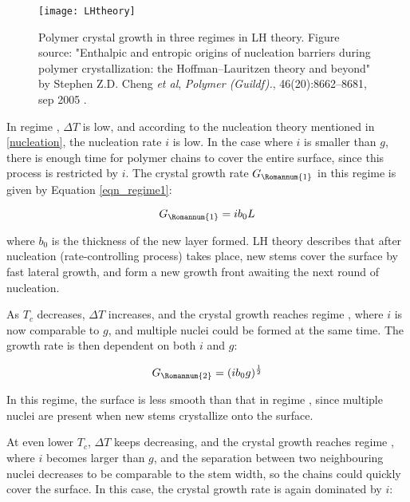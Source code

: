 \begin{figure}[H]
\center
\texttt{[image: LHtheory]}
\caption[Polymer crystal growth in three regimes in LH theory.]{Polymer crystal growth in three regimes in LH theory. Figure source: "Enthalpic and entropic origins of nucleation barriers during polymer crystallization: the Hoffman–Lauritzen theory and beyond" by Stephen Z.D. Cheng \textit{et al}, \textit{Polymer (Guildf).}, 46(20):8662–8681, sep 2005  \cite{Cheng2005}.}
\label{fig:LH theory}
\end{figure}

In regime , $\Delta T$ is low, and according to the nucleation theory \cite{Turnbull1949} mentioned in \ref{nucleation}, the nucleation rate $i$ is low. In the case where $i$ is smaller than $g$, there is enough time for polymer chains to cover the entire surface, since this process is restricted by $i$. The crystal growth rate $G_{\Romannum{1}}$ in this regime is given by Equation \ref{eqn_regime1}:

\begin{equation}
\label{eqn_regime1}
G_{\Romannum{1}} = i b_{0} L
\end{equation}

\noindent
where $b_{0}$ is the thickness of the new layer formed. LH theory describes that after nucleation (rate-controlling process) takes place, new stems cover the surface by fast lateral growth, and form a new growth front awaiting the next round of nucleation.

As $T_{c}$ decreases, $\Delta T$ increases, and the crystal growth reaches regime , where $i$ is now comparable to $g$, and multiple nuclei could be formed at the same time. The growth rate is then dependent on both $i$ and $g$:

\begin{equation}
\label{eqn_regime2}
G_{\Romannum{2}} = (i b_{0} g)^{\frac{1}{2}}
\end{equation}

In this regime, the surface is less smooth than that in regime , since multiple nuclei are present when new stems crystallize onto the surface.

At even lower $T_{c}$, $\Delta T$ keeps decreasing, and the crystal growth reaches regime , where $i$ becomes larger than $g$, and the separation between two neighbouring nuclei decreases to be comparable to the stem width, so the chains could quickly cover the surface. In this case, the crystal growth rate is again dominated by $i$:

